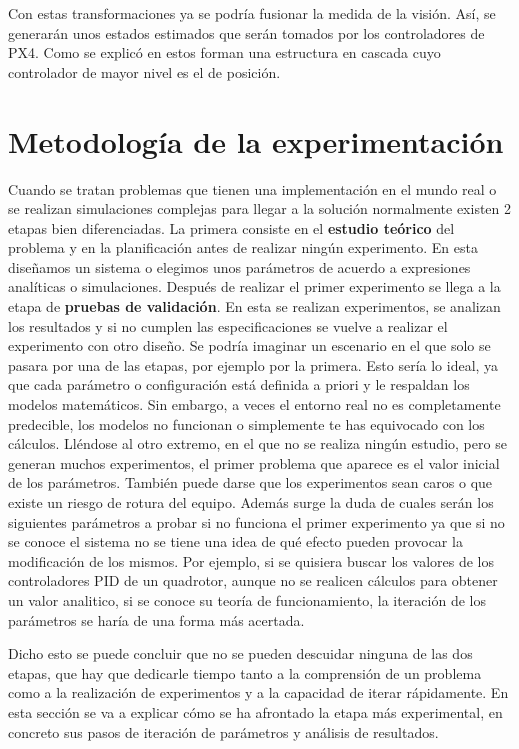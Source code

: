 Con estas transformaciones ya se podría fusionar la medida de la visión. Así, se generarán unos estados estimados que serán tomados por los controladores de PX4. Como se explicó en \cite{arias2019control} estos forman una estructura en cascada cuyo controlador de mayor nivel es el de posición. 




\section{Metodología de la experimentación} 
Cuando se tratan problemas que tienen una implementación en el mundo real o se realizan simulaciones complejas para llegar a la solución normalmente existen 2 etapas bien diferenciadas. La primera consiste en el \textbf{estudio teórico} del problema y en la planificación antes de realizar ningún experimento. En esta diseñamos un sistema o elegimos unos parámetros de acuerdo a expresiones analíticas o simulaciones. Después de realizar el primer experimento se llega a la etapa de \textbf{pruebas de validación}. En esta se realizan experimentos, se analizan los resultados y si no cumplen las especificaciones se vuelve a realizar el experimento con otro diseño.    
Se podría imaginar un escenario en el que solo se pasara por una de las etapas, por ejemplo por la primera. Esto sería lo ideal, ya que cada parámetro o configuración está definida a priori y le respaldan los modelos matemáticos. Sin embargo, a veces el entorno real no es completamente predecible, los modelos no funcionan o simplemente te has equivocado con los cálculos. 
Lléndose al otro extremo, en el que no se realiza ningún estudio, pero se generan muchos experimentos, el primer problema que aparece es el valor inicial de los parámetros. También  puede darse que los experimentos sean caros o que existe un riesgo de rotura del equipo. Además surge la duda de cuales serán los siguientes parámetros a probar si no funciona el primer experimento ya que si no se conoce el sistema no se tiene una idea de qué efecto pueden provocar la modificación de los mismos. 
Por ejemplo, si se quisiera buscar los valores de los controladores PID de un quadrotor, aunque no se realicen cálculos para obtener un valor analitico, si se conoce su teoría de funcionamiento, la iteración de los parámetros se haría de una forma más acertada.  

Dicho esto se puede concluir que no se pueden descuidar ninguna de las dos etapas, que hay que dedicarle tiempo tanto a la comprensión de un problema como a la realización de experimentos y a la capacidad de iterar rápidamente. En esta sección se va a explicar cómo se ha afrontado la etapa más experimental, en concreto sus pasos de iteración de parámetros y análisis de resultados.


